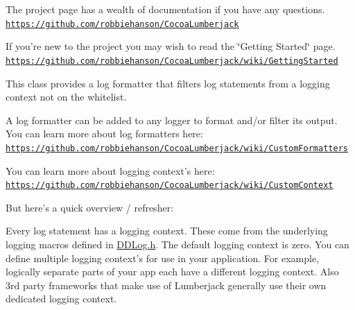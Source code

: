 The project page has a wealth of documentation if you have any questions. \href{https://github.com/robbiehanson/CocoaLumberjack}{\tt https\-://github.\-com/robbiehanson/\-Cocoa\-Lumberjack}

If you're new to the project you may wish to read the \char`\"{}\-Getting Started\char`\"{} page. \href{https://github.com/robbiehanson/CocoaLumberjack/wiki/GettingStarted}{\tt https\-://github.\-com/robbiehanson/\-Cocoa\-Lumberjack/wiki/\-Getting\-Started}

This class provides a log formatter that filters log statements from a logging context not on the whitelist.

A log formatter can be added to any logger to format and/or filter its output. You can learn more about log formatters here\-: \href{https://github.com/robbiehanson/CocoaLumberjack/wiki/CustomFormatters}{\tt https\-://github.\-com/robbiehanson/\-Cocoa\-Lumberjack/wiki/\-Custom\-Formatters}

You can learn more about logging context's here\-: \href{https://github.com/robbiehanson/CocoaLumberjack/wiki/CustomContext}{\tt https\-://github.\-com/robbiehanson/\-Cocoa\-Lumberjack/wiki/\-Custom\-Context}

But here's a quick overview / refresher\-:

Every log statement has a logging context. These come from the underlying logging macros defined in \hyperlink{_d_d_log_8h}{D\-D\-Log.\-h}. The default logging context is zero. You can define multiple logging context's for use in your application. For example, logically separate parts of your app each have a different logging context. Also 3rd party frameworks that make use of Lumberjack generally use their own dedicated logging context. 


